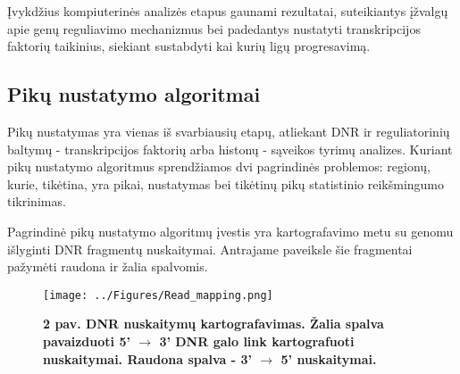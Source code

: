 \documentclass[12pt]{article}
\begin{document}
Įvykdžius kompiuterinės analizės etapus gaunami rezultatai, suteikiantys
įžvalgų apie genų reguliavimo mechanizmus bei padedantys nustatyti
transkripcijos faktorių taikinius, siekiant sustabdyti kai kurių ligų
progresavimą.


\newpage

\subsection{Pikų nustatymo algoritmai}
Pikų nustatymas yra vienas iš svarbiausių etapų, atliekant DNR ir reguliatorinių
baltymų - transkripcijos faktorių arba histonų - sąveikos tyrimų analizes.
Kuriant pikų nustatymo algoritmus sprendžiamos dvi pagrindinės problemos:
regionų, kurie, tikėtina, yra pikai, nustatymas bei tikėtinų pikų statistinio
reikšmingumo tikrinimas.

Pagrindinė pikų nustatymo algoritmų įvestis yra kartografavimo metu su genomu
išlyginti DNR fragmentų nuskaitymai. Antrajame paveiksle šie fragmentai pažymėti
raudona ir žalia spalvomis.






\begin{figure}[ht]
    \begin{center}
        \captionsetup{justification=centering}
        \texttt{[image: ../Figures/Read\_mapping.png]}
        \vspace{-1\baselineskip}
        \caption*{\small\textbf{2 pav. DNR nuskaitymų kartografavimas. Žalia
                                spalva pavaizduoti 5' \(\rightarrow\) 3' DNR
                                galo link kartografuoti nuskaitymai. Raudona
                                spalva - 3' \(\rightarrow\) 5' nuskaitymai.}}
    \end{center}
\end{figure}
\end{document}
